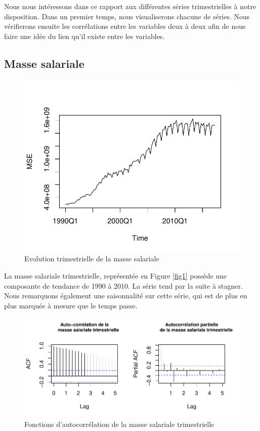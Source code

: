 \documentclass[11pt,]{article}
\begin{document}
Nous nous intéressons dans ce rapport aux différentes séries
trimestrielles à notre disposition. Dans un premier temps, nous
visualiserons chacune de séries. Nous vérifierons ensuite les
corrélations entre les variables deux à deux afin de nous faire une idée
du lien qu'il existe entre les variables.

\subsection{\texorpdfstring{Masse salariale
\label{MSE}}{Masse salariale }}\label{masse-salariale}

\begin{figure}

{\centering \includegraphics{Rapport_final_files/figure-latex/unnamed-chunk-1-1} 

}

\caption{\label{fig1} Evolution trimestrielle de la masse salariale}\label{fig:unnamed-chunk-1}
\end{figure}

La masse salariale trimestrielle, représentée en Figure \ref{fig1}
possède une composante de tendance de 1990 à 2010. La série tend par la
suite à stagner. Nous remarquons également une saisonnalité sur cette
série, qui est de plus en plus marquée à mesure que le temps passe.

\begin{figure}[htbp]
\centering
\includegraphics{Rapport_final_files/figure-latex/unnamed-chunk-2-1.pdf}
\caption{\label{fig2} Fonctions d'autocorrélation de la masse salariale
trimestrielle}
\end{figure}
\end{document}
